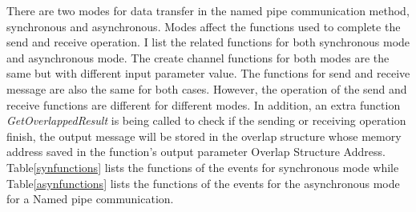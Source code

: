 There are two modes for data transfer in the named pipe communication method, synchronous and asynchronous.  Modes affect the functions used to complete the send and receive operation. I list the related functions for both synchronous mode and asynchronous mode. The create channel functions for both modes are the same but with different input parameter value. The functions for send and receive message are also the same for both cases. However, the operation of the send and receive functions are different for different modes. In addition, an extra function \textit{GetOverlappedResult} is being called to check if the sending or receiving operation finish, the output message will be stored in the overlap structure whose memory address saved in the function's output parameter Overlap Structure Address. Table\ref{synfunctions} lists the functions of the events for synchronous mode while Table\ref{asynfunctions} lists the functions of the events for the asynchronous mode for a Named pipe communication.


